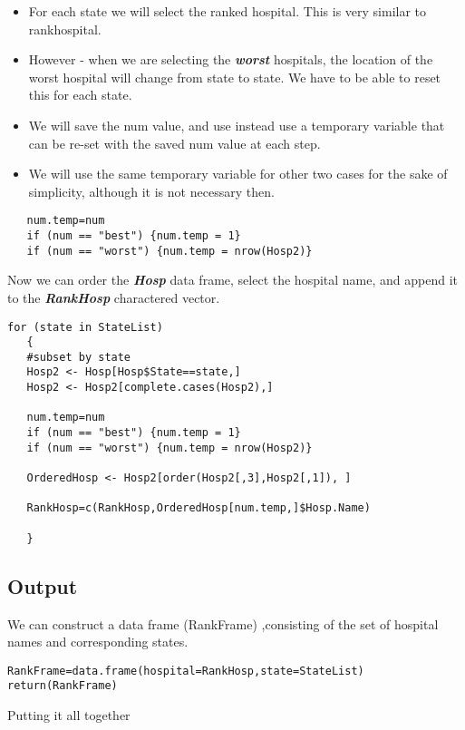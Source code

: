 \documentclass[]{article}
\begin{document}
\begin{itemize}
\item For each state we will select the ranked hospital. This is very similar to rankhospital.
\item 
However - when we are selecting the \textit{\textbf{worst}} hospitals, the location of the worst hospital will change from state to state. We have to be able to reset this for each state. 
\item We will save the num value, and use instead use a temporary variable that can be re-set with the saved num value at each step. \item We will use the same temporary variable for other two cases for the sake of simplicity, although it is not necessary then.
\end{itemize}
\begin{verbatim}
   num.temp=num
   if (num == "best") {num.temp = 1}
   if (num == "worst") {num.temp = nrow(Hosp2)}
\end{verbatim}
Now we can order the \textit{\textbf{Hosp}} data frame, select the hospital name, and append it to the \textit{\textbf{RankHosp}} charactered vector.
\begin{framed}
\begin{verbatim}
for (state in StateList)
   {
   #subset by state
   Hosp2 <- Hosp[Hosp$State==state,]
   Hosp2 <- Hosp2[complete.cases(Hosp2),]
   
   num.temp=num
   if (num == "best") {num.temp = 1}
   if (num == "worst") {num.temp = nrow(Hosp2)}

   OrderedHosp <- Hosp2[order(Hosp2[,3],Hosp2[,1]), ]
     
   RankHosp=c(RankHosp,OrderedHosp[num.temp,]$Hosp.Name)
     
   }
\end{verbatim}
\end{framed}

\subsection{Output}
We can construct a data frame (RankFrame) ,consisting of the set of hospital names and corresponding states.
\begin{framed}
\begin{verbatim}
RankFrame=data.frame(hospital=RankHosp,state=StateList)
return(RankFrame)
\end{verbatim}
\end{framed}
\newpage
Putting it all together
\end{document}
